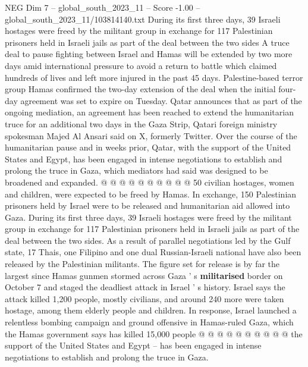 \begin{textsample}{NEG Dim 7 – global\_south\_2023\_11 – Score -1.00 – global\_south\_2023\_11/103814140.txt}  \label{ex:f7_neg_152}
During its first three days, 39 Israeli hostages were freed by the militant group in exchange for 117 Palestinian prisoners held in Israeli jails as part of the deal between the two sides A truce deal to pause fighting between Israel and Hamas will be extended by two more days amid international pressure to avoid a return to battle which claimed hundreds of lives and left more injured in the past 45 days.
Palestine-based terror group Hamas confirmed the two-day extension of the deal when the initial four-day agreement was set to expire on Tuesday.
Qatar announces that as part of the ongoing mediation, an agreement has been reached to extend the humanitarian truce for an additional two days in the Gaza Strip, Qatari foreign ministry spokesman Majed Al Ansari said on X, formerly Twitter.
Over the course of the humanitarian pause and in weeks prior, Qatar, with the support of the United States and Egypt, has been engaged in intense negotiations to establish and prolong the truce in Gaza, which mediators had said was designed to be broadened and expanded. @ @ @ @ @ @ @ @ @ @ 50 civilian hostages, women and children, were expected to be freed by Hamas.
In exchange, 150 Palestinian prisoners held by Israel were to be released and humanitarian aid allowed into Gaza.
During its first three days, 39 Israeli hostages were freed by the militant group in exchange for 117 Palestinian prisoners held in Israeli jails as part of the deal between the two sides.
As a result of parallel negotiations led by the Gulf state, 17 Thais, one Filipino and one dual Russian-Israeli national have also been released by the Palestinian militants.
The figure set for release is by far the largest since Hamas gunmen stormed across Gaza ' s \textbf{militarised} border on October 7 and staged the deadliest attack in Israel ' s history.
Israel says the attack killed 1,200 people, mostly civilians, and around 240 more were taken hostage, among them elderly people and children.
In response, Israel launched a relentless bombing campaign and ground offensive in Hamas-ruled Gaza, which the Hamas government says has killed 15,000 people @ @ @ @ @ @ @ @ @ @ the support of the United States and Egypt -- has been engaged in intense negotiations to establish and prolong the truce in Gaza.

\end{textsample}
